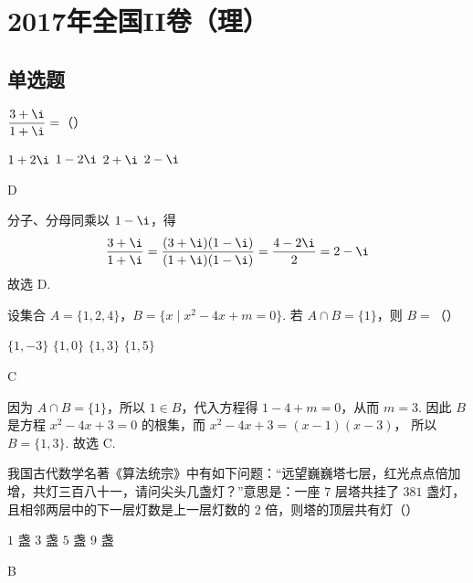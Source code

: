 \chapter{2017年全国II卷（理）}

\section{单选题}

\begin{problem}
\(\dfrac{3+\i}{1+\i}=\)（\quad）

\choices
    {\(1+2\i\)}
    {\(1-2\i\)}
    {\(2+\i\)}
    {\(2-\i\)}
\end{problem}

\begin{answer}
D
\end{answer}

\begin{solution}
分子、分母同乘以 \(1-\i\)，得
\[
\frac{3+\i}{1+\i}=\frac{(3+\i)(1-\i)}{(1+\i)(1-\i)}
=\frac{4-2\i}{2}=2-\i
\]
故选 D.
\end{solution}

\begin{problem}
设集合 \(A=\{1,2,4\}\)，\(B=\{x\mid x^2-4x+m=0\}\). 若 \(A\cap B=\{1\}\)，则 \(B=\)（\quad）

\choices
    {\(\{1,-3\}\)}
    {\(\{1,0\}\)}
    {\(\{1,3\}\)}
    {\(\{1,5\}\)}
\end{problem}

\begin{answer}
C
\end{answer}

\begin{solution}
因为 \(A\cap B=\{1\}\)，所以 \(1\in B\)，代入方程得 \(1-4+m=0\)，从而 \(m=3\). 因此 \(B\) 是方程 \(x^2-4x+3=0\) 的根集，而
\(x^2-4x+3=(x-1)(x-3)\)，
所以 \(B=\{1,3\}\). 故选 C.
\end{solution}

\begin{problem}
我国古代数学名著《算法统宗》中有如下问题：“远望巍巍塔七层，红光点点倍加增，共灯三百八十一，请问尖头几盏灯？”意思是：一座 \(7\text{ 层}\)塔共挂了 \(381\text{ 盏}\)灯，且相邻两层中的下一层灯数是上一层灯数的 \(2\text{ 倍}\)，则塔的顶层共有灯（\quad）

\choices
    {\(1\text{ 盏}\)}
    {\(3\text{ 盏}\)}
    {\(5\text{ 盏}\)}
    {\(9\text{ 盏}\)}
\end{problem}

\begin{answer}
B
\end{answer}

